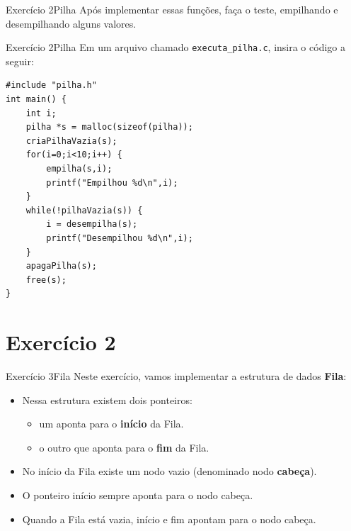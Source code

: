 \documentclass[aspectratio=169]{beamer}
\begin{document}

\begin{frame}[fragile]{Exercício 2}{Pilha}
Após implementar essas funções, faça o teste, empilhando e desempilhando alguns valores.
\end{frame}


\begin{frame}[fragile]{Exercício 2}{Pilha}
Em um arquivo chamado \verb|executa_pilha.c|, insira  o código a seguir:
\begin{lstlisting}[style=CStyle]
#include "pilha.h"
int main() {
    int i;
    pilha *s = malloc(sizeof(pilha));
    criaPilhaVazia(s);
    for(i=0;i<10;i++) {
        empilha(s,i);
        printf("Empilhou %d\n",i);
    }
    while(!pilhaVazia(s)) {
        i = desempilha(s);
        printf("Desempilhou %d\n",i);    
    }
    apagaPilha(s);
    free(s);
}
\end{lstlisting}  
\end{frame}


\section{Exercício 2}

\begin{frame}[fragile]{Exercício 3}{Fila}
Neste exercício, vamos implementar a estrutura de dados {\bf Fila}:
\begin{itemize}
 \item Nessa estrutura existem dois ponteiros:
 \begin{itemize}
    \item um aponta para o {\bf início} da Fila.
    \item o outro que aponta para o {\bf fim} da Fila.
 \end{itemize}
 \item No início da Fila existe um nodo vazio (denominado nodo {\bf cabeça}).
 \item O ponteiro início sempre aponta para o nodo cabeça.
 \item Quando a Fila está vazia, início e fim apontam para o nodo cabeça.
\end{itemize}
\end{frame}
\end{document}
